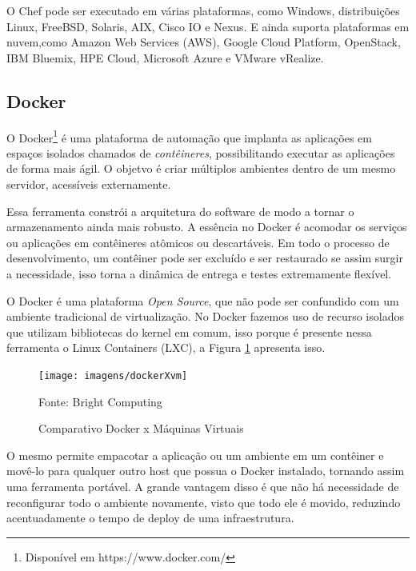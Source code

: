 O Chef pode ser executado em várias plataformas, como Windows, distribuições Linux, FreeBSD, Solaris, AIX, Cisco IO e Nexus. E ainda suporta plataformas em nuvem,como Amazon Web Services (AWS), Google Cloud Platform, OpenStack, IBM Bluemix, HPE Cloud, Microsoft Azure e VMware vRealize.

\subsection{Docker}

O Docker\footnote{Disponível em https://www.docker.com/} é uma plataforma de automação que implanta as aplicações em espaços isolados chamados de \textit{contêineres}, possibilitando executar as aplicações de forma mais ágil. O objetvo é criar múltiplos ambientes dentro de um mesmo servidor, acessíveis externamente.

Essa ferramenta constrói a arquitetura do software de modo a tornar o armazenamento ainda mais robusto. A essência no Docker é acomodar os serviços ou aplicações em contêineres atômicos ou descartáveis. Em todo o processo de desenvolvimento, um contêiner pode ser excluído e ser restaurado se assim surgir a necessidade, isso torna a dinâmica de entrega e testes extremamente flexível.\cite{mattiaskane}

O Docker é uma plataforma \textit{Open Source}, que não pode ser confundido com um ambiente tradicional de virtualização. No Docker fazemos uso de recurso isolados que utilizam bibliotecas do kernel em comum, isso porque é presente nessa ferramenta o Linux Containers (LXC), a Figura \ref{fig:dockerXvm} apresenta isso.

\begin{figure} [htb]
	\centering
	
	\texttt{[image: imagens/dockerXvm]}
	\caption{Comparativo Docker x Máquinas Virtuais}
	Fonte: Bright Computing\footnotemark
	\label{fig:dockerXvm}
	
\end{figure}


O mesmo permite empacotar a aplicação ou um ambiente em um contêiner e movê-lo para qualquer outro host que possua o Docker instalado, tornando assim uma ferramenta portável. A grande vantagem disso é que não há necessidade de reconfigurar todo o ambiente novamente, visto que todo ele é movido, reduzindo acentuadamente o tempo de deploy de uma infraestrutura.\cite{mattiaskane}


